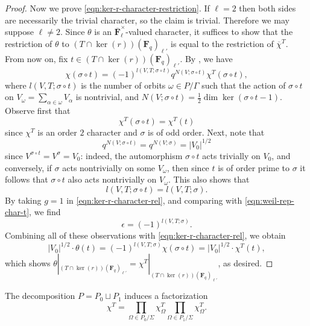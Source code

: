 \documentclass[reqno]{amsart}
\numberwithin{equation}{subsection}
\newcommand{\F}{\mathbf{F}}
\newcommand{\ol}[1]{\overline{#1}}
\theoremstyle{remark}
\numberwithin{equation}{subsection}
\numberwithin{figure}{subsection}
\begin{document}
\begin{proof}
Now we prove \eqref{eqn:ker-r-character-restriction}. If $\ell = 2$ then both sides are necessarily the trivial character, so the claim is trivial. Therefore we may suppose $\ell \neq 2$. Since $\theta$ is an $\ol\F_\ell^\times$-valued character, it suffices to show that the restriction of $\theta$ to $(T \cap \ker(r))(\F_q)_{\ell'}$ is equal to the restriction of $\ol\chi^T$. From now on, fix $t \in (T \cap \ker(r))(\F_q)_{\ell'}$. By \cite[Corollary 4.8.1]{Ger77}, we have
\begin{equation}\label{eqn:weil-rep-char-t}
\chi(\sigma \circ t) = (-1)^{l(V, T; \sigma \circ t)}q^{N(V; \sigma \circ t)}\chi^T(\sigma \circ t),
\end{equation}
where $l(V, T; \sigma \circ t)$ is the number of orbits $\omega \in P/\Gamma$ such that the action of $\sigma \circ t$ on $V_\omega = \sum_{\alpha \in \omega} V_\alpha$ is nontrivial, and $N(V;\sigma \circ t) = \frac{1}{2}\dim\ker(\sigma \circ t-1)$. Observe first that 
\[
\chi^T(\sigma \circ t) = \chi^T(t)
\]
since $\chi^T$ is an order $2$ character and $\sigma$ is of odd order. Next, note that 
\[
q^{N(V;\sigma \circ t)} = q^{N(V;\sigma)} = |V_0|^{1/2}
\]
since $V^{\sigma \circ t} = V^\sigma = V_0$: indeed, the automorphism $\sigma \circ t$ acts trivially on $V_0$, and conversely, if $\sigma$ acts nontrivially on some $V_\omega$, then since $t$ is of order prime to $\sigma$ it follows that $\sigma \circ t$ also acts nontrivially on $V_\omega$. This also shows that 
\[
l(V, T; \sigma \circ t) = l(V, T; \sigma).
\]
By taking $g = 1$ in \eqref{eqn:ker-r-character-rel}, and comparing with \eqref{eqn:weil-rep-char-t}, we find
\[
\epsilon = (-1)^{l(V, T;\sigma)}.
\]
Combining all of these observations with \eqref{eqn:ker-r-character-rel}, we obtain
\[
|V_0|^{1/2} \cdot \theta(t) = (-1)^{l(V,T;\sigma)}\chi(\sigma \circ t) = |V_0|^{1/2} \cdot \chi^T(t),
\]
which shows $\theta|_{(T \cap \ker(r))(\F_q)_{\ell'}} = \chi^T|_{(T \cap \ker(r))(\F_q)_{\ell'}}$, as desired.
\end{proof}

The decomposition $P = P_0 \sqcup P_1$ induces a factorization 
\[
\chi^T = \prod_{\Omega \in P_0/\Sigma} \chi_\Omega^T \prod_{\Omega \in P_1/\Sigma} \chi_\Omega^T.
\]
\end{document}
